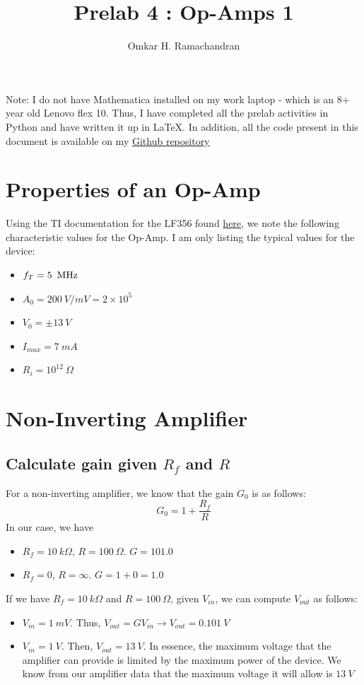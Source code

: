 \documentclass[english]{article}
\newcommand{\MHz}{\,{\rm MHz}}
\begin{document}
\title{Prelab 4 : Op-Amps 1}
\author{Omkar H. Ramachandran}

\maketitle

Note: I do not have Mathematica installed on my work laptop - which is an 8+ 
year old Lenovo flex 10. Thus, I have completed all the prelab activities in
Python and have written it up in \LaTeX. In addition, all the code present in
this document is available on my 
\href{https://github.com/ShadowWarden/electronics}{Github repository}

\section{Properties of an Op-Amp}
Using the TI documentation for the LF356 found \href{http://www.ti.com/lit/ds/symlink/lf356.pdf}{here},
we note the following characteristic values for the Op-Amp. I am only listing
the typical values for the device:
\begin{itemize}
	\item $f_T = 5\ \MHz$
	\item $A_0 = 200\ V/mV = 2\times10^{5}$
	\item $V_0 = \pm 13\ V$
	\item $I_{max} = 7\ mA$
	\item $R_i = 10^{12}\ \Omega$
\end{itemize}

\section{Non-Inverting Amplifier}
\subsection{Calculate gain given $R_f$ and $R$}
For a non-inverting amplifier, we know that the gain $G_0$ is as follows:
$$ G_0 = 1+ \frac{R_f}{R} $$
In our case, we have
\begin{itemize}
	\item $R_f = 10\ k\Omega$, $R = 100\ \Omega$. $G = 101.0$
	\item $R_f = 0$, $R = \infty$. $G = 1+0 = 1.0$
\end{itemize}
If we have $R_f = 10\ k\Omega$ and $R = 100\ \Omega$, given $V_{in}$, we can
compute $V_{out}$ as follows:
\begin{itemize}
	\item $V_{in}=1\ mV$. Thus, $V_{out} = GV_{in}\rightarrow V_{out} = 0.101\ V$
	\item $V_{in}=1\ V$. Then, $V_{out} = 13\ V$. In essence, the maximum voltage
		that the amplifier can provide is limited by the maximum power of the device.
		We know from our amplifier data that the maximum voltage it will allow is 
		$13\ V$
\end{itemize}
\end{document}
